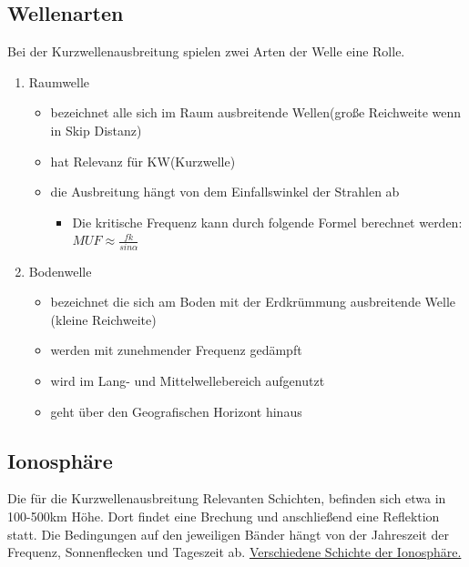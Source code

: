 \documentclass[fontzize=12pt,paper=a4,twoside=false]{article}
\begin{document}
    \subsection[]{Wellenarten}
        Bei der Kurzwellenausbreitung spielen zwei Arten der Welle eine Rolle.
        \begin{enumerate}
            \item Raumwelle
            \begin{itemize}
                \item bezeichnet alle sich im Raum ausbreitende Wellen(große Reichweite wenn in Skip Distanz)
                \item hat Relevanz für KW(Kurzwelle)
                \item die Ausbreitung hängt von dem Einfallswinkel der Strahlen ab
                \begin{itemize}
                    \item Die kritische Frequenz kann durch folgende Formel berechnet werden:\newline \( MUF \approx \frac{f k}{sin \alpha }\)	 
                \end{itemize}
            \end{itemize}
            \item Bodenwelle
            \begin{itemize}
                \item bezeichnet die sich am Boden mit der Erdkrümmung ausbreitende Welle (kleine Reichweite)
                \item werden mit zunehmender Frequenz gedämpft
                \item wird im Lang- und Mittelwellebereich aufgenutzt
                \item geht über den Geografischen Horizont hinaus
            \end{itemize}
        \end{enumerate}
    \subsection[]{Ionosphäre}
        Die für die Kurzwellenausbreitung Relevanten Schichten, befinden sich etwa in 100-500km Höhe.
        Dort findet eine Brechung und anschließend eine Reflektion statt.
        Die Bedingungen auf den jeweiligen Bänder hängt von der Jahreszeit der Frequenz, Sonnenflecken und Tageszeit ab. \newline
        \href{https://www.darc.de/fileadmin/filemounts/referate/ajw/Onlinelehrgang/e09/Bild9-2.gif}{Verschiedene Schichte der Ionosphäre.}
\end{document}
